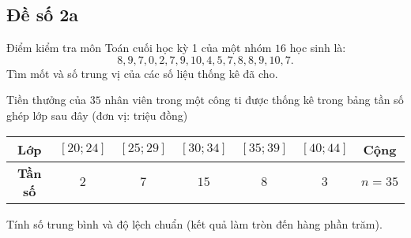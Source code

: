 \subsection{Đề số 2a}
\setcounter{bt}{0}
\begin{bt}%
	Điểm kiểm tra môn Toán cuối học kỳ 1 của một nhóm $16$ học sinh là: $$8, 9, 7, 0, 2, 7, 9, 10, 4, 5, 7, 8, 8, 9, 10, 7.$$
	Tìm mốt và số trung vị của các số liệu thống kê đã cho.
\end{bt}
\begin{bt}%
	Tiền thưởng của $35$ nhân viên trong một công ti được thống kê trong bảng tần số ghép lớp sau đây (đơn vị: triệu đồng)
	\begin{center}
		\begin{tabular}{|c|c|c|c|c|c|c|}
			\hline 
			\bf Lớp &$[20;24]$ &$[25;29]$&$[30;34]$&$[35;39]$&$[40;44]$& Cộng\\ 
			\hline
			\bf Tần số &$2$&$7$&$15$&$8$&$3$&$n=35$\\
			\hline
		\end{tabular}
	\end{center}
	Tính số trung bình và độ lệch chuẩn (kết quả làm tròn đến hàng phần trăm).
\end{bt}
